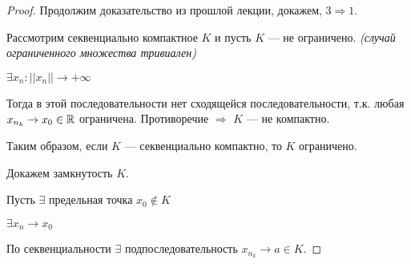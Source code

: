 

\cfoot{}
\rfoot{\today}


\begin{proof}
    Продолжим доказательство из прошлой лекции, докажем, $3\Rightarrow1$.

    Рассмотрим секвенциально компактное $K$ и пусть $K$ --- не ограничено. \textit{(случай ограниченного множества тривиален)}

    $\exists x_n : ||x_n||\to+\infty$

    Тогда в этой последовательности нет сходящейся последовательности, т.к. любая $x_{n_k}\to x_0\in\operatorname*{\mathbb{R}}$ ограничена. Противоречие $\Rightarrow$ $K$ --- не компактно.

    Таким образом, если $K$ --- секвенциально компактно, то $K$ ограничено.

    Докажем замкнутость $K$.

    Пусть $\exists$ предельная точка $x_0\not\in K$

    $\exists x_n\to x_0$

    По секвенциальности $\exists$ подпоследовательность $x_{n_k}\to a\in K$.
\end{proof}


